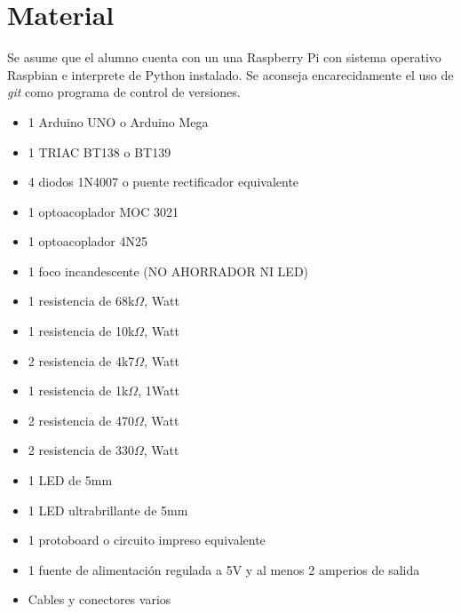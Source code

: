 
%
%
\section{Material}%
\label{sec:material}
Se asume que el alumno cuenta con un una Raspberry Pi con sistema operativo Raspbian e interprete de Python instalado. Se aconseja encarecidamente el uso de \textit{git} como programa de control de versiones.

\begin{itemize}[noitemsep]
	\item 1 Arduino UNO o Arduino Mega
	\item 1 TRIAC BT138 o BT139
	\item 4 diodos 1N4007 o puente rectificador equivalente
	\item 1 optoacoplador MOC 3021
	\item 1 optoacoplador 4N25
	\item 1 foco incandescente (NO AHORRADOR NI LED)
	\item 1 resistencia de 68k$\Omega$, Watt
	\item 1 resistencia de 10k$\Omega$, Watt
	\item 2 resistencia de 4k7$\Omega$, Watt
	\item 1 resistencia de  1k$\Omega$, 1Watt
	\item 2 resistencia de 470$\Omega$, Watt
	\item 2 resistencia de 330$\Omega$, Watt
	\item 1 LED de 5mm
	\item 1 LED ultrabrillante de 5mm
	\item 1 protoboard o circuito impreso equivalente
	\item 1 fuente de alimentación regulada a 5V y al menos 2 amperios de salida
	\item Cables y conectores varios
\end{itemize}
